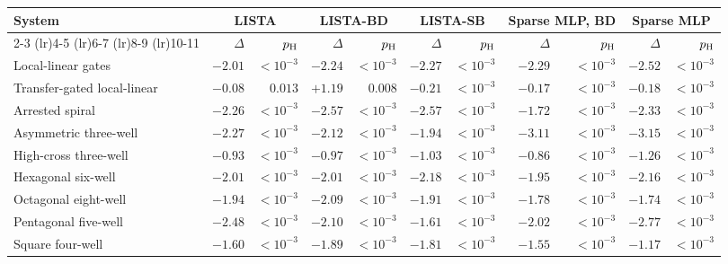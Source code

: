 \begin{tabular}{@{}l rr rr rr rr rr@{}}
\toprule
System & \multicolumn{2}{c}{LISTA} & \multicolumn{2}{c}{LISTA-BD} & \multicolumn{2}{c}{LISTA-SB} & \multicolumn{2}{c}{Sparse MLP, BD} & \multicolumn{2}{c}{Sparse MLP} \\
\cmidrule(lr){2-3} \cmidrule(lr){4-5} \cmidrule(lr){6-7} \cmidrule(lr){8-9} \cmidrule(lr){10-11}
 & $\Delta$ & $p_{\rm H}$ & $\Delta$ & $p_{\rm H}$ & $\Delta$ & $p_{\rm H}$ & $\Delta$ & $p_{\rm H}$ & $\Delta$ & $p_{\rm H}$ \\
\midrule
Local-linear gates & $\mathbf{-2.01}$ & $<\!10^{-3}$ & $\mathbf{-2.24}$ & $<\!10^{-3}$ & $\mathbf{-2.27}$ & $<\!10^{-3}$ & $\mathbf{-2.29}$ & $<\!10^{-3}$ & $\mathbf{-2.52}$ & $<\!10^{-3}$ \\
Transfer-gated local-linear & $\mathbf{-0.08}$ & $0.013$ & $\mathbf{+1.19}$ & $0.008$ & $\mathbf{-0.21}$ & $<\!10^{-3}$ & $\mathbf{-0.17}$ & $<\!10^{-3}$ & $\mathbf{-0.18}$ & $<\!10^{-3}$ \\
Arrested spiral & $\mathbf{-2.26}$ & $<\!10^{-3}$ & $\mathbf{-2.57}$ & $<\!10^{-3}$ & $\mathbf{-2.57}$ & $<\!10^{-3}$ & $\mathbf{-1.72}$ & $<\!10^{-3}$ & $\mathbf{-2.33}$ & $<\!10^{-3}$ \\
Asymmetric three-well & $\mathbf{-2.27}$ & $<\!10^{-3}$ & $\mathbf{-2.12}$ & $<\!10^{-3}$ & $\mathbf{-1.94}$ & $<\!10^{-3}$ & $\mathbf{-3.11}$ & $<\!10^{-3}$ & $\mathbf{-3.15}$ & $<\!10^{-3}$ \\
High-cross three-well & $\mathbf{-0.93}$ & $<\!10^{-3}$ & $\mathbf{-0.97}$ & $<\!10^{-3}$ & $\mathbf{-1.03}$ & $<\!10^{-3}$ & $\mathbf{-0.86}$ & $<\!10^{-3}$ & $\mathbf{-1.26}$ & $<\!10^{-3}$ \\
Hexagonal six-well & $\mathbf{-2.01}$ & $<\!10^{-3}$ & $\mathbf{-2.01}$ & $<\!10^{-3}$ & $\mathbf{-2.18}$ & $<\!10^{-3}$ & $\mathbf{-1.95}$ & $<\!10^{-3}$ & $\mathbf{-2.16}$ & $<\!10^{-3}$ \\
Octagonal eight-well & $\mathbf{-1.94}$ & $<\!10^{-3}$ & $\mathbf{-2.09}$ & $<\!10^{-3}$ & $\mathbf{-1.91}$ & $<\!10^{-3}$ & $\mathbf{-1.78}$ & $<\!10^{-3}$ & $\mathbf{-1.74}$ & $<\!10^{-3}$ \\
Pentagonal five-well & $\mathbf{-2.48}$ & $<\!10^{-3}$ & $\mathbf{-2.10}$ & $<\!10^{-3}$ & $\mathbf{-1.61}$ & $<\!10^{-3}$ & $\mathbf{-2.02}$ & $<\!10^{-3}$ & $\mathbf{-2.77}$ & $<\!10^{-3}$ \\
Square four-well & $\mathbf{-1.60}$ & $<\!10^{-3}$ & $\mathbf{-1.89}$ & $<\!10^{-3}$ & $\mathbf{-1.81}$ & $<\!10^{-3}$ & $\mathbf{-1.55}$ & $<\!10^{-3}$ & $\mathbf{-1.17}$ & $<\!10^{-3}$ \\

\end{tabular}
